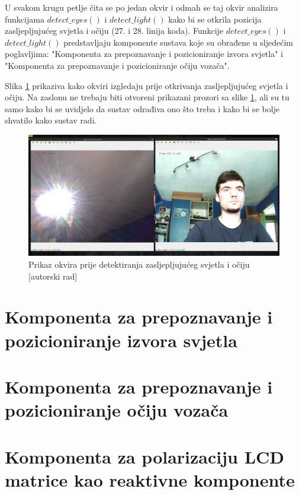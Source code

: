 \documentclass{foi}
\begin{document}
U svakom krugu petlje čita se po jedan okvir i odmah se taj okvir analizira funkcijama $detect\_eyes()$ i $detect\_light()$ kako bi se otkrila pozicija zasljepljujućeg svjetla i očiju (27. i 28. linija koda). Funkcije $detect\_eyes()$ i $detect\_light()$ predstavljaju komponente sustava koje su obrađene u sljedećim poglavljima: "Komponenta za prepoznavanje i pozicioniranje izvora svjetla" i "Komponenta za prepoznavanje i pozicioniranje očiju vozača".

Slika \ref{fig:sustav1} prikaziva kako okviri izgledaju prije otkrivanja zasljepljujućeg svjetla i očiju. Na zaslonu ne trebaju biti otvoreni prikazani prozori sa slike \ref{fig:sustav1}, ali su tu samo kako bi se uvidjelo da sustav odrađiva ono što treba i kako bi se bolje shvatilo kako sustav radi.

\begin{figure}[h!]
    \centering
    \includegraphics[width=1\textwidth]{slike/sustav1}
    \caption{Prikaz okvira prije detektiranja zasljepljujućeg svjetla i očiju [autorski rad]}
    \label{fig:sustav1}
\end{figure}

\section{Komponenta za prepoznavanje i pozicioniranje izvora svjetla}

\section{Komponenta za prepoznavanje i pozicioniranje očiju vozača}

\section{Komponenta za polarizaciju LCD matrice kao reaktivne komponente}
\end{document}

